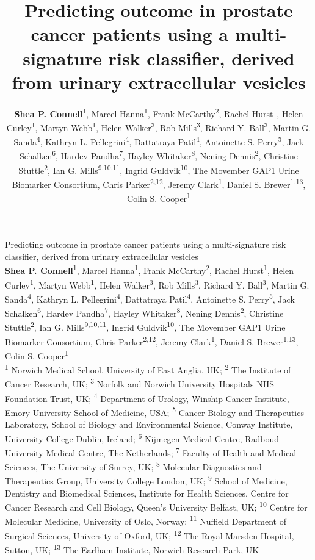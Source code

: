 \documentclass[article,30pt,extrafontsizes]{memoir}
\author{\large\textbf{Shea P. Connell}\normalsize\textsuperscript{1}, Marcel
Hanna\textsuperscript{1}, Frank McCarthy\textsuperscript{2}, Rachel
Hurst\textsuperscript{1}, Helen Curley\textsuperscript{1}, Martyn
Webb\textsuperscript{1}, Helen Walker\textsuperscript{3}, Rob
Mills\textsuperscript{3}, Richard Y. Ball\textsuperscript{3}, Martin G.
Sanda\textsuperscript{4}, Kathryn L. Pellegrini\textsuperscript{4},
Dattatraya Patil\textsuperscript{4}, Antoinette S.
Perry\textsuperscript{5}, Jack Schalken\textsuperscript{6}, Hardev
Pandha\textsuperscript{7}, Hayley Whitaker\textsuperscript{8}, Nening
Dennis\textsuperscript{2}, Christine Stuttle\textsuperscript{2}, Ian G.
Mills\textsuperscript{9,10,11}, Ingrid Guldvik\textsuperscript{10}, The
Movember GAP1 Urine Biomarker Consortium, Chris
Parker\textsuperscript{2,12}, Jeremy Clark\textsuperscript{1}, Daniel S.
Brewer\textsuperscript{1,13}, Colin S. Cooper\textsuperscript{1}}
\title{\fontfamily{phv}\selectfont Predicting outcome in prostate cancer
patients using a multi-signature risk classifier, derived from urinary
extracellular vesicles}
\begin{document}
\begin{mdframed}[style=brentsmdfstyle]

\renewcommand*\footnoterule{}
\renewcommand{\thempfootnote}{\footnotesize\color{footnotetextcol}{\arabic{mpfootnote}}}

\begingroup
  \centering
  \color{titletextcol}
\vspace{0.5in}
  \Huge{\selectfont Predicting outcome in prostate cancer
patients using a multi-signature risk classifier, derived from urinary
extracellular vesicles}  \\[0.3in]
  \color{authortextcol} \normalsize{\large\textbf{Shea P. Connell}\normalsize\textsuperscript{1}, Marcel
Hanna\textsuperscript{1}, Frank McCarthy\textsuperscript{2}, Rachel
Hurst\textsuperscript{1}, Helen Curley\textsuperscript{1}, Martyn
Webb\textsuperscript{1}, Helen Walker\textsuperscript{3}, Rob
Mills\textsuperscript{3}, Richard Y. Ball\textsuperscript{3}, Martin G.
Sanda\textsuperscript{4}, Kathryn L. Pellegrini\textsuperscript{4},
Dattatraya Patil\textsuperscript{4}, Antoinette S.
Perry\textsuperscript{5}, Jack Schalken\textsuperscript{6}, Hardev
Pandha\textsuperscript{7}, Hayley Whitaker\textsuperscript{8}, Nening
Dennis\textsuperscript{2}, Christine Stuttle\textsuperscript{2}, Ian G.
Mills\textsuperscript{9,10,11}, Ingrid Guldvik\textsuperscript{10}, The
Movember GAP1 Urine Biomarker Consortium, Chris
Parker\textsuperscript{2,12}, Jeremy Clark\textsuperscript{1}, Daniel S.
Brewer\textsuperscript{1,13}, Colin S. Cooper\textsuperscript{1}} \\[0.2in]
  \color{affiliationtextcol} \footnotesize{\textsuperscript{1} Norwich Medical School, University of East Anglia,
UK; \textsuperscript{2} The Institute of Cancer Research, UK;
\textsuperscript{3} Norfolk and Norwich University Hospitals NHS
Foundation Trust, UK; \textsuperscript{4} Department of Urology, Winship
Cancer Institute, Emory University School of Medicine, USA;
\textsuperscript{5} Cancer Biology and Therapeutics Laboratory, School
of Biology and Environmental Science, Conway Institute, University
College Dublin, Ireland; \textsuperscript{6} Nijmegen Medical Centre,
Radboud University Medical Centre, The Netherlands; \textsuperscript{7}
Faculty of Health and Medical Sciences, The University of Surrey, UK;
\textsuperscript{8} Molecular Diagnostics and Therapeutics Group,
University College London, UK; \textsuperscript{9} School of Medicine,
Dentistry and Biomedical Sciences, Institute for Health Sciences, Centre
for Cancer Research and Cell Biology, Queen's University Belfast, UK;
\textsuperscript{10} Centre for Molecular Medicine, University of Oslo,
Norway; \textsuperscript{11} Nuffield Department of Surgical Sciences,
University of Oxford, UK; \textsuperscript{12} The Royal Marsden
Hospital, Sutton, UK; \textsuperscript{13} The Earlham Institute,
Norwich Research Park, UK}
  \vspace{0.2in}


\end{mdframed}
\end{document}
